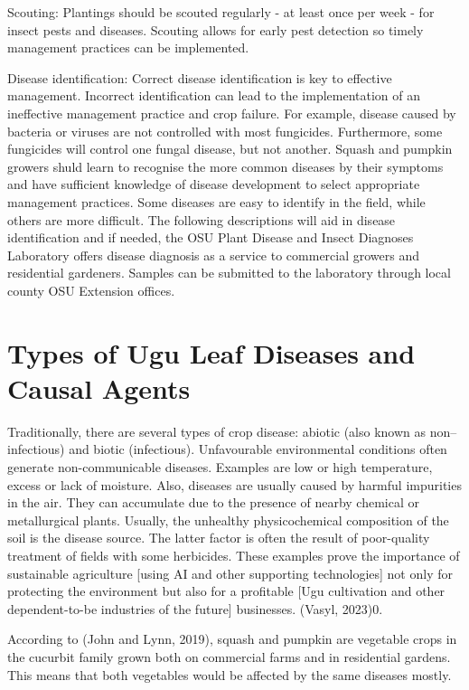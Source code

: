 Scouting: Plantings should be scouted regularly - at least once per week - for insect pests and diseases. Scouting allows for early pest detection so timely management practices can be implemented. \citep{johnPumpkinSquashDiseases2019a}

Disease identification: Correct disease identification is key to effective management. Incorrect identification can lead to the implementation of an ineffective management practice and crop failure. For example, disease caused by bacteria or viruses are not controlled with most fungicides. Furthermore, some fungicides will control one fungal disease, but not another. Squash and pumpkin growers shuld learn to recognise the more common diseases by their symptoms and have sufficient knowledge of disease development to select appropriate management practices. Some diseases are easy to identify in the field, while others are more difficult. The following descriptions will aid in disease identification and if needed, the OSU Plant Disease and Insect Diagnoses Laboratory offers disease diagnosis as a service to commercial growers and residential gardeners. Samples can be submitted to the laboratory through local county OSU Extension offices.  \citep{johnPumpkinSquashDiseases2019a}

\section{Types of Ugu Leaf Diseases and Causal Agents}
Traditionally, there are several types of crop disease: abiotic (also known as non--infectious) and biotic (infectious). Unfavourable environmental conditions often generate non-communicable diseases. Examples are low or high temperature, excess or lack of moisture. Also, diseases are usually caused by harmful impurities in the air. They can accumulate due to the presence of nearby chemical or metallurgical plants. Usually, the unhealthy physicochemical composition of the soil is the disease source. The latter factor is often the result of poor-quality treatment of fields with some herbicides. These examples prove the importance of sustainable agriculture [using AI and other supporting technologies] not only for protecting the environment but also for a profitable [Ugu cultivation and other dependent-to-be industries of the future] businesses. (Vasyl, 2023)0. 

According to (John and Lynn, 2019), squash and pumpkin are vegetable crops in the cucurbit family grown both on commercial farms and in residential gardens. This means that both vegetables would be affected by the same diseases mostly. 


